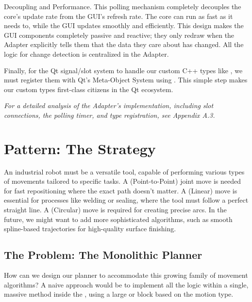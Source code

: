 \begin{principlebox}{Decoupling and Performance.}
    This polling mechanism completely decouples the core's update rate from the GUI's refresh rate. The core can run as fast as it needs to, while the GUI updates smoothly and efficiently. This design makes the GUI components completely passive and reactive; they only redraw when the Adapter explicitly tells them that the data they care about has changed. All the logic for change detection is centralized in the Adapter.
\end{principlebox}

Finally, for the Qt signal/slot system to handle our custom C++ types like , we must register them with Qt's Meta-Object System using . This simple step makes our custom types first-class citizens in the Qt ecosystem.

\textit{For a detailed analysis of the Adapter's implementation, including slot connections, the polling timer, and type registration, see Appendix A.3.}


\section{Pattern: The Strategy}
\label{sec:pattern_strategy_conceptual}

An industrial robot must be a versatile tool, capable of performing various types of movements tailored to specific tasks. A  (Point-to-Point) joint move is needed for fast repositioning where the exact path doesn't matter. A  (Linear) move is essential for processes like welding or sealing, where the tool must follow a perfect straight line. A  (Circular) move is required for creating precise arcs. In the future, we might want to add more sophisticated algorithms, such as smooth spline-based trajectories for high-quality surface finishing.

\subsection{The Problem: The Monolithic Planner}
\label{subsec:monolithic_planner_problem}

How can we design our planner to accommodate this growing family of movement algorithms? A naive approach would be to implement all the logic within a single, massive method inside the , using a large  or  block based on the motion type.

